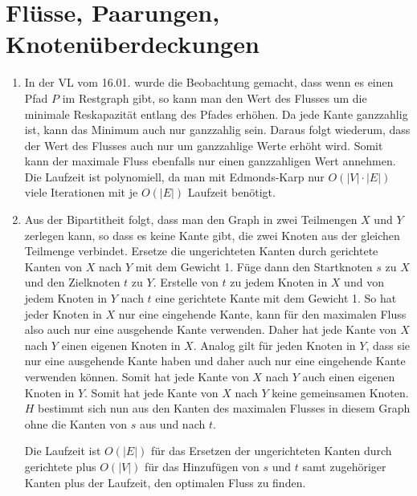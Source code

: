 \documentclass[a4paper,10pt]{article}
\begin{document}
\section{Flüsse, Paarungen, Knotenüberdeckungen}
\begin{enumerate}
\item In der VL vom 16.01. wurde die Beobachtung gemacht, dass wenn es einen Pfad $P$ im Restgraph gibt, so kann man den Wert des Flusses um die minimale Reskapazität entlang des Pfades erhöhen. Da jede Kante ganzzahlig ist, kann das Minimum auch nur ganzzahlig sein. Daraus folgt wiederum, dass der Wert des Flusses auch nur um ganzzahlige Werte erhöht wird.
Somit kann der maximale Fluss ebenfalls nur einen ganzzahligen Wert annehmen.
Die Laufzeit ist polynomiell, da man mit Edmonds-Karp nur $O(|V| \cdot |E|)$ viele Iterationen mit je $O(|E|)$ Laufzeit benötigt.

\item Aus der Bipartitheit folgt, dass man den Graph in zwei Teilmengen $X$ und $Y$ zerlegen kann, so dass es keine Kante gibt, die zwei Knoten aus der gleichen Teilmenge verbindet. Ersetze die ungerichteten Kanten durch gerichtete Kanten von $X$ nach $Y$ mit dem Gewicht 1. Füge dann den Startknoten $s$ zu $X$ und den Zielknoten $t$ zu $Y$. Erstelle von $t$ zu jedem Knoten in $X$  und von jedem Knoten in $Y$ nach $t$ eine gerichtete Kante mit dem Gewicht 1. So hat jeder Knoten in $X$ nur eine eingehende Kante, kann für den maximalen Fluss also auch nur eine ausgehende Kante verwenden. Daher hat jede Kante von $X$ nach $Y$ einen eigenen Knoten in $X$. Analog gilt für jeden Knoten in $Y$, dass sie nur eine ausgehende Kante haben und daher auch nur eine eingehende Kante verwenden können. Somit hat jede Kante von $X$ nach $Y$ auch einen eigenen Knoten in $Y$. Somit hat jede Kante von $X$ nach $Y$ keine gemeinsamen Knoten. $H$ bestimmt sich nun aus den Kanten des maximalen Flusses in diesem Graph ohne die Kanten von $s$ aus und nach $t$.

Die Laufzeit ist $O(|E|)$ für das Ersetzen der ungerichteten Kanten durch gerichtete plus $O(|V|)$ für das Hinzufügen von $s$ und $t$ samt zugehöriger Kanten plus der Laufzeit, den optimalen Fluss zu finden.


\end{enumerate}
\end{document}
